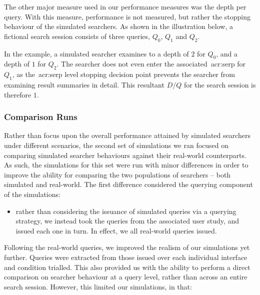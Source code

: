 The other major measure used in our performance measures was the depth per query. With this measure, performance is not measured, but rather the stopping behaviour of the simulated searchers. As shown in the illustration below, a fictional search session consists of three queries, $Q_0$, $Q_1$ and $Q_2$.

\begin{figure}[h]
    \centering
    \vspace*{-6mm}
\end{figure}

In the example, a simulated searcher examines to a depth of $2$ for $Q_0$, and a depth of $1$ for $Q_2$. The searcher does not even enter the associated~\gls{acr:serp} for $Q_1$, as the~\gls{acr:serp} level stopping decision point prevents the searcher from examining result summaries in detail. This resultant $D/Q$ for the search session is therefore $1$.

\subsubsection{Comparison Runs}\label{chap:csm:method:sim:runs:comparison}
Rather than focus upon the overall performance attained by simulated searchers under different scenarios, the second set of simulations we ran focused on comparing simulated searcher behaviours against their real-world counterparts. As such, the simulations for this set were run with minor differences in order to improve the ability for comparing the two populations of searchers -- both simulated and real-world. The first difference considered the querying component of the simulations:

\begin{itemize}
    \item{rather than considering the issuance of simulated queries via a querying strategy, we instead took the queries from the associated user study, and issued each one in turn. In effect, we  all real-world queries issued.}
\end{itemize}

Following the real-world queries, we improved the realism of our simulations yet further. Queries were extracted from those issued over each individual interface and condition trialled. This also provided us with the ability to perform a direct comparison on searcher behaviour at a query level, rather than across an entire search session. However, this limited our simulations, in that:

